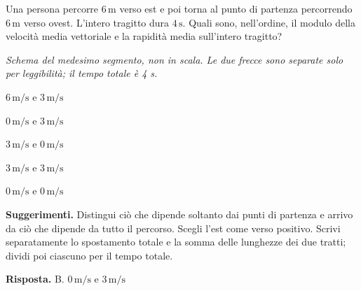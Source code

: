 \documentclass[11pt,a4paper]{article}
\begin{document}
\begin{samepage}
\par\smallskip
Una persona percorre \(6\,\mathrm{m}\) verso est e poi torna al punto di partenza percorrendo \(6\,\mathrm{m}\) verso ovest. L’intero tragitto dura \(4\,\mathrm{s}\). Quali sono, nell’ordine, il modulo della velocità media vettoriale e la rapidità media sull’intero tragitto?\par

\begin{center}
\par
\small\itshape Schema del medesimo segmento, non in scala. Le due frecce sono separate solo per leggibilità; il tempo totale è 4 s.
\end{center}
\begin{list}{}{\setlength{\leftmargin}{1.4em}\setlength{\itemsep}{.1em}\setlength{\parsep}{0pt}}\small
\item[A.] \(6\,\mathrm{m/s}\) e \(3\,\mathrm{m/s}\)
\item[B.] \(0\,\mathrm{m/s}\) e \(3\,\mathrm{m/s}\)
\item[C.] \(3\,\mathrm{m/s}\) e \(0\,\mathrm{m/s}\)
\item[D.] \(3\,\mathrm{m/s}\) e \(3\,\mathrm{m/s}\)
\item[E.] \(0\,\mathrm{m/s}\) e \(0\,\mathrm{m/s}\)
\end{list}
{\small\textbf{Suggerimenti.} Distingui ciò che dipende soltanto dai punti di partenza e arrivo da ciò che dipende da tutto il percorso. Scegli l’est come verso positivo. Scrivi separatamente lo spostamento totale e la somma delle lunghezze dei due tratti; dividi poi ciascuno per il tempo totale.\par}
\medskip\noindent\textbf{Risposta.} B. \(0\,\mathrm{m/s}\) e \(3\,\mathrm{m/s}\)\par



\end{samepage}
\end{document}
